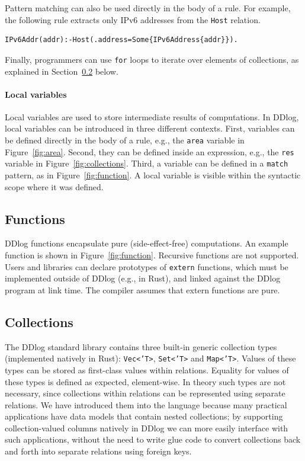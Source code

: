 Pattern matching can also be used directly in the body of a rule.  For example,
the following rule extracts only IPv6 addresses from the \texttt{Host}
relation.

\begin{lstlisting}[language=ddlog]
IPv6Addr(addr):-Host(.address=Some{IPv6Address{addr}}).
\end{lstlisting}

Finally, programmers can use \texttt{for} loops to iterate
over elements of collections, as explained in Section~\ref{sec:collections}
below.

\paragraph{Local variables}

Local variables are used to store intermediate results of computations.
In DDlog, local variables can be introduced in three different contexts.  First,
variables can be defined directly in the body of a rule, e.g., the \texttt{area}
variable in Figure~\ref{fig:area}.  Second, they can be defined inside
an expression, e.g., the \texttt{res} variable in Figure~\ref{fig:collections}.
Third, a variable can be defined in a \texttt{match} pattern,
as in Figure~\ref{fig:function}.
A local variable is visible within the syntactic scope where it was defined.

\subsection{Functions}

DDlog functions encapsulate pure (side-effect-free) computations.  
An example function is shown in
Figure~\ref{fig:function}.  Recursive functions are not supported.
Users and libraries can declare prototypes of \texttt{extern}
functions, which must be implemented outside of DDlog (e.g., in Rust),
and linked against the DDlog program at link time.  The compiler
assumes that extern functions are pure.

\subsection{Collections}\label{sec:collections}

The DDlog standard library contains three built-in generic collection
types (implemented natively in Rust): \texttt{Vec<'T>},
\texttt{Set<'T>} and \texttt{Map<'T>}.  Values of these types can be
stored as first-class values within relations.  Equality for values
of these types is defined as expected, element-wise.  In theory such
types are not necessary, since collections within relations can be
represented using separate relations.  We have
introduced them into the language because many practical applications
have data models that contain nested collections; by supporting
collection-valued columns natively in DDlog we can more easily
interface with such applications, without the need to write glue code
to convert collections back and forth into separate relations using
foreign keys.


